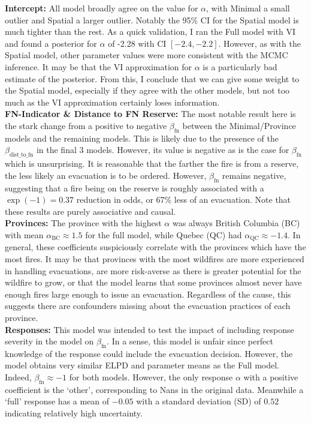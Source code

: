 \textbf{Intercept:} All model broadly agree on the value for $\alpha$, with Minimal a small outlier and Spatial a larger outlier. Notably the 95\% CI for the Spatial model is much tighter than the rest. As a quick validation, I ran the Full model with VI and found a posterior for $\alpha$ of -2.28 with CI $[-2.4, -2.2]$. However, as with the Spatial model, other parameter values were more consistent with the MCMC inference. It may be that the VI approximation for $\alpha$ is a particularly bad estimate of the posterior. From this, I conclude that we can give some weight to the Spatial model, especially if they agree with the other models, but not too much as the VI approximation certainly loses information.\\
\textbf{FN-Indicator \& Distance to FN Reserve:} The most notable result here is the stark change from a positive to negative $\beta_{\text{fn}}$ between the Minimal/Province models and the remaining models. This is likely due to the presence of the $\beta_{\text{dist\_to\_fn}}$ in the final 3 models. However, its value is negative as is the case for $\beta_{\text{fn}}$ which is unsurprising. It is reasonable that the farther the fire is from a reserve, the less likely an evacuation is to be ordered. However, $\beta_{\text{fn}}$ remains negative, suggesting that a fire being on the reserve is roughly associated with a $\exp(-1)=0.37$ reduction in odds, or 67\% less of an evacuation. Note that these results are purely associative and causal.\\
\textbf{Provinces:} The province with the highest $\alpha$ was always British Columbia (BC) with mean $\alpha_{\text{BC}} \approx 1.5$ for the full model, while Quebec (QC) had $\alpha_{\text{QC}} \approx -1.4$. In general, these coefficients suspiciously correlate with the provinces which have the most fires. It may be that provinces with the most wildfires are more experienced in handling evacuations, are more risk-averse as there is greater potential for the wildfire to grow, or that the model learns that some provinces almost never have enough fires large enough to issue an evacuation. Regardless of the cause, this suggests there are confounders missing about the evacuation practices of each province.\\
\textbf{Responses:} This model was intended to test the impact of including response severity in the model on $\beta_{\text{fn}}$. In a sense, this model is unfair since perfect knowledge of the response could include the evacuation decision. However, the model obtains very similar ELPD and parameter means as the Full model. Indeed, $\beta_{\text{fn}}\approx -1$ for both models. However, the only response $\alpha$ with a positive coefficient is the `other', corresponding to Nans in the original data. Meanwhile a `full' response has a mean of $-0.05$ with a standard deviation (SD) of $0.52$ indicating relatively high uncertainty. \\

